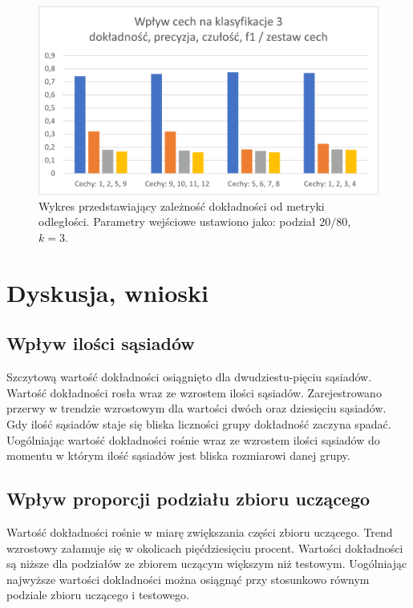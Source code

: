 \documentclass{classrep}
\begin{document}
\begin{figure}[H]
\label{features_set_3}
\includegraphics[scale=1]{features_set_3}
\caption{Wykres przedstawiający zależność dokładności od metryki odległości. Parametry wejściowe ustawiono jako: podział $20/80$, $k=3$.}
\end{figure}



\section{Dyskusja, wnioski}


\subsection{Wpływ ilości sąsiadów}
Szczytową wartość dokładności osiągnięto dla dwudziestu-pięciu sąsiadów. Wartość dokładności rosła wraz ze wzrostem ilości sąsiadów. Zarejestrowano przerwy w trendzie wzrostowym dla wartości dwóch oraz dziesięciu sąsiadów. Gdy ilość sąsiadów staje się bliska liczności grupy dokładność zaczyna spadać. Uogólniając wartość dokładności rośnie wraz ze wzrostem ilości sąsiadów do momentu w którym ilość sąsiadów jest bliska rozmiarowi danej grupy.

\subsection{Wpływ proporcji podziału zbioru uczącego}
Wartość dokładności rośnie w miarę zwiększania części zbioru uczącego. Trend wzrostowy załamuje się w okolicach pięćdziesięciu procent. Wartości dokładności są niższe dla podziałów ze zbiorem uczącym większym niż testowym. Uogólniając najwyższe wartości dokładności można osiągnąć przy stosunkowo równym podziale zbioru uczącego i testowego.
\end{document}
